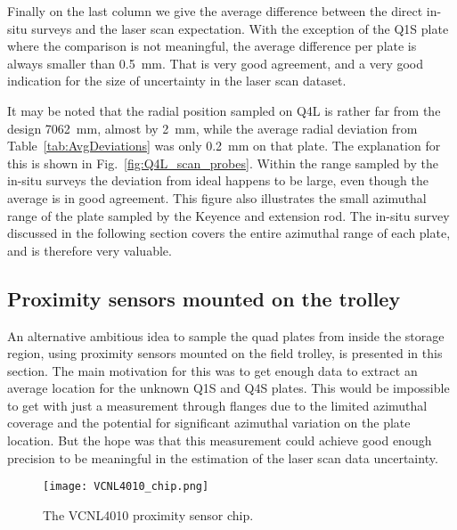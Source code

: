 Finally on the last column we give the average difference between the direct in-situ surveys and the laser scan expectation. 
With the exception of the Q1S plate where the comparison is not meaningful, the average difference per plate is always smaller than \SI{0.5}{mm}. That is very good agreement, and a very good indication for the size of uncertainty in the laser scan dataset.

It may be noted that the radial position sampled on Q4L is rather far from the design \SI{7062}{mm}, almost by \SI{2}{mm}, while the average radial deviation from Table~\ref{tab:AvgDeviations} was only \SI{0.2}{mm} on that plate.
The explanation for this is shown in Fig.~\ref{fig:Q4L_scan_probes}. Within the range sampled by the in-situ surveys the deviation from ideal happens to be large, even though the average is in good agreement.
This figure also illustrates the small azimuthal range of the plate sampled by the Keyence and extension rod.
The in-situ survey discussed in the following section covers the entire azimuthal range of each plate, and is therefore very valuable.












\subsection{\label{sec:ProximitySensors} Proximity sensors mounted on the trolley}


An alternative ambitious idea to sample the quad plates from inside the storage region, using proximity sensors mounted on the field trolley, is presented in this section.
The main motivation for this was to get enough data to extract an average location for the unknown Q1S and Q4S plates. This would be impossible to get with just a measurement through flanges due to the limited azimuthal coverage and the potential for significant azimuthal variation on the plate location.
But the hope was that this measurement could achieve good enough precision to be meaningful in the estimation of the laser scan data uncertainty.


\begin{wrapfigure}{rt}{0.6\textwidth}
	\centering
	\texttt{[image: VCNL4010\_chip.png]}
	\caption{The VCNL4010 proximity sensor chip.
	}\label{fig:VCNL4010_chip}
\end{wrapfigure}


